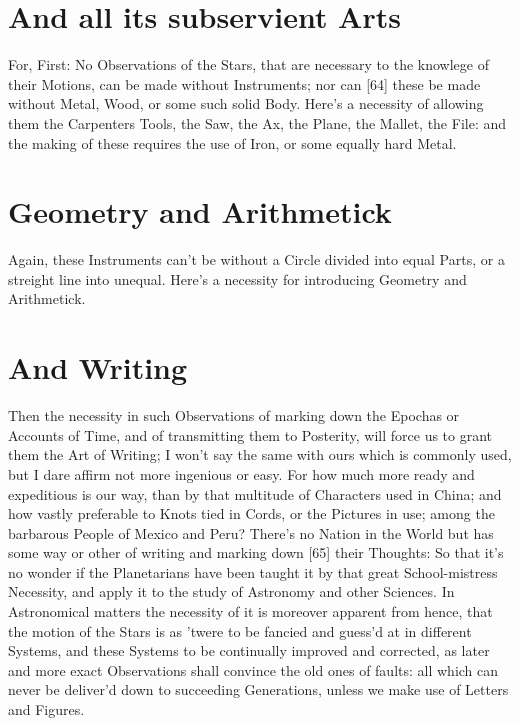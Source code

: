 \documentclass[letterpaper]{book}
\begin{document}
\section{And all its subservient Arts}

For, First: No Observations of the Stars, that are necessary to the knowlege
of their Motions, can be made without Instruments; nor can [64] these be
made without Metal, Wood, or some such solid Body. Here's a necessity of
allowing them the Carpenters Tools, the Saw, the Ax, the Plane, the Mallet,
the File: and the making of these requires the use of Iron, or some equally
hard Metal.


\section{Geometry and Arithmetick}

Again, these Instruments can't be without a Circle divided into equal Parts,
or a streight line into unequal. Here's a necessity for introducing Geometry
and Arithmetick.



\section{And Writing}

Then the necessity in such Observations of marking down the Epochas or
Accounts of Time, and of transmitting them to Posterity, will force us to
grant them the Art of Writing; I won't say the same with ours which is
commonly used, but I dare affirm not more ingenious or easy. For how
much more ready and expeditious is our way, than by that multitude of
Characters used in China; and how vastly preferable to Knots tied in Cords,
or the Pictures in use; among the barbarous People of Mexico and Peru?
There's no Nation in the World but has some way or other of writing and
marking down [65] their Thoughts: So that it's no wonder if the Planetarians
have been taught it by that great School-mistress Necessity, and apply it to
the study of Astronomy and other Sciences. In Astronomical matters the
necessity of it is moreover apparent from hence, that the motion of the
Stars is as 'twere to be fancied and guess'd at in different Systems, and
these Systems to be continually improved and corrected, as later and more
exact Observations shall convince the old ones of faults: all which can never
be deliver'd down to succeeding Generations, unless we make use of Letters
and Figures.
\end{document}
